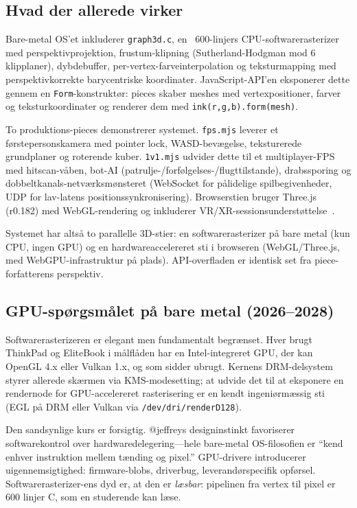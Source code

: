 \documentclass[10pt,letterpaper,twocolumn]{article}
\begin{document}
\subsection{Hvad der allerede virker}

Bare-metal OS'et inkluderer \texttt{graph3d.c}, en ~600-linjers CPU-softwarerasterizer med perspektivprojektion, frustum-klipning (Sutherland-Hodgman mod 6 klipplaner), dybdebuffer, per-vertex-farveinterpolation og teksturmapping med perspektivkorrekte barycentriske koordinater. JavaScript-API'en eksponerer dette gennem en \texttt{Form}-konstruktør: pieces skaber meshes med vertexpositioner, farver og teksturkoordinater og renderer dem med \texttt{ink(r,g,b).form(mesh)}.

To produktions-pieces demonstrerer systemet. \texttt{fps.mjs} leverer et førstepersonskamera med pointer lock, WASD-bevægelse, teksturerede grundplaner og roterende kuber. \texttt{1v1.mjs} udvider dette til et multiplayer-FPS med hitscan-våben, bot-AI (patrulje-/forfølgelses-/flugttilstande), drabssporing og dobbeltkanals-netværksmønsteret (WebSocket for pålidelige spilbegivenheder, UDP for lav-latens positionssynkronisering). Browserstien bruger Three.js (r0.182) med WebGL-rendering og inkluderer VR/XR-sessionsunderstøttelse~\citep{sutherland1968head}.

Systemet har altså to parallelle 3D-stier: en softwarerasterizer på bare metal (kun CPU, ingen GPU) og en hardwareaccelereret sti i browseren (WebGL/Three.js, med WebGPU-infrastruktur på plads). API-overfladen er identisk set fra piece-forfatterens perspektiv.

\subsection{GPU-spørgsmålet på bare metal (2026--2028)}

Softwarerasterizeren er elegant men fundamentalt begrænset. Hver brugt ThinkPad og EliteBook i målflåden har en Intel-integreret GPU, der kan OpenGL 4.x eller Vulkan 1.x, og som sidder ubrugt. Kernens DRM-delsystem styrer allerede skærmen via KMS-modesetting; at udvide det til at eksponere en rendernode for GPU-accelereret rasterisering er en kendt ingeniørmæssig sti (EGL på DRM eller Vulkan via \texttt{/dev/dri/renderD128}).

Den sandsynlige kurs er forsigtig. @jeffreys designinstinkt favoriserer softwarekontrol over hardwaredelegering---hele bare-metal OS-filosofien er ``kend enhver instruktion mellem tænding og pixel.'' GPU-drivere introducerer uigennemsigtighed: firmware-blobs, driverbug, leverandørspecifik opførsel. Softwarerasterizer-ens dyd er, at den er \emph{læsbar}: pipelinen fra vertex til pixel er 600 linjer C, som en studerende kan læse.
\end{document}
